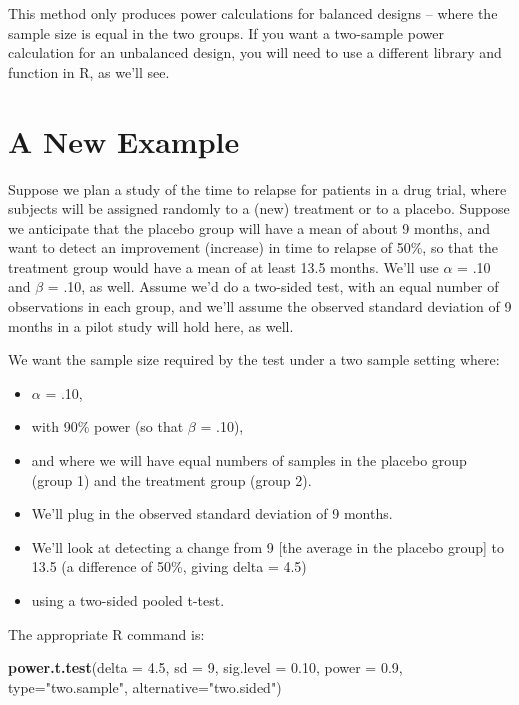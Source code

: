 \documentclass[
]{book}
\newenvironment{Shaded}{\begin{snugshade}}{\end{snugshade}}
\newcommand{\DataTypeTok}[1]{\textcolor[rgb]{0.13,0.29,0.53}{#1}}
\newcommand{\DecValTok}[1]{\textcolor[rgb]{0.00,0.00,0.81}{#1}}
\newcommand{\FloatTok}[1]{\textcolor[rgb]{0.00,0.00,0.81}{#1}}
\newcommand{\KeywordTok}[1]{\textcolor[rgb]{0.13,0.29,0.53}{\textbf{#1}}}
\newcommand{\NormalTok}[1]{#1}
\newcommand{\StringTok}[1]{\textcolor[rgb]{0.31,0.60,0.02}{#1}}
\providecommand{\tightlist}{%
  \setlength{\itemsep}{0pt}\setlength{\parskip}{0pt}}
\begin{document}
This method only produces power calculations for balanced designs -- where the sample size is equal in the two groups. If you want a two-sample power calculation for an unbalanced design, you will need to use a different library and function in R, as we'll see.

\hypertarget{a-new-example}{%
\section{A New Example}\label{a-new-example}}

Suppose we plan a study of the time to relapse for patients in a drug trial, where subjects will be assigned randomly to a (new) treatment or to a placebo. Suppose we anticipate that the placebo group will have a mean of about 9 months, and want to detect an improvement (increase) in time to relapse of 50\%, so that the treatment group would have a mean of at least 13.5 months. We'll use \(\alpha\) = .10 and \(\beta\) = .10, as well. Assume we'd do a two-sided test, with an equal number of observations in each group, and we'll assume the observed standard deviation of 9 months in a pilot study will hold here, as well.

We want the sample size required by the test under a two sample setting where:

\begin{itemize}
\tightlist
\item
  \(\alpha\) = .10,
\item
  with 90\% power (so that \(\beta\) = .10),
\item
  and where we will have equal numbers of samples in the placebo group (group 1) and the treatment group (group 2).\\
\item
  We'll plug in the observed standard deviation of 9 months.
\item
  We'll look at detecting a change from 9 {[}the average in the placebo group{]} to 13.5 (a difference of 50\%, giving delta = 4.5)
\item
  using a two-sided pooled t-test.
\end{itemize}

The appropriate R command is:

\begin{Shaded}
\begin{Highlighting}[]
\KeywordTok{power.t.test}\NormalTok{(}\DataTypeTok{delta =} \FloatTok{4.5}\NormalTok{, }\DataTypeTok{sd =} \DecValTok{9}\NormalTok{, }
             \DataTypeTok{sig.level =} \FloatTok{0.10}\NormalTok{, }\DataTypeTok{power =} \FloatTok{0.9}\NormalTok{, }
             \DataTypeTok{type=}\StringTok{"two.sample"}\NormalTok{, }
             \DataTypeTok{alternative=}\StringTok{"two.sided"}\NormalTok{)}
\end{Highlighting}
\end{Shaded}
\end{document}
